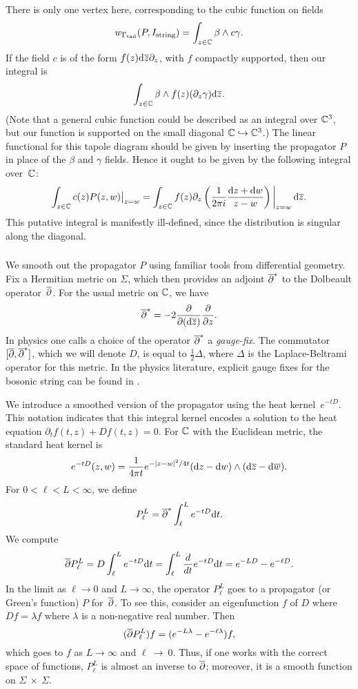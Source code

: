 There is only one vertex here, corresponding to the cubic function on fields
\[
w_{\Gamma_{\rm tad}}(P,I_{\rm string}) = \int_{z \in \mathbb C} \beta \wedge c\gamma.
\]
If the field $c$ is of the form $f(z) {\rm d} \overline{z} \partial_z$,
with $f$ compactly supported, 
then our integral is
\[
\int_{z \in \mathbb C} \beta \wedge f(z)(\partial_z\gamma) {\rm d} \overline{z}.
\]
(Note that a general cubic function could be described as an integral over $\mathbb C^3$,
but our function is supported on the small diagonal $\mathbb C \hookrightarrow \mathbb C^3$.)
The linear functional for this tapole diagram should be given by inserting the propagator $P$ in place of the $\beta$ and $\gamma$ fields. 
Hence it ought to be given by the following integral over~$\mathbb C$:
\[
\int_{z \in \mathbb C} c(z)P(z,w)\big|_{z = w}  
= \int_{z \in \mathbb C} f(z) \partial_z \left(  \frac{1}{2 \pi i} \frac{{\rm d} z + {\rm d} w}{z-w}\right)\bigg|_{z = w}\, {\rm d} \overline{z}.
\]
This putative integral is manifestly ill-defined,
since the distribution is singular along the diagonal.

\subsubsection{}

We smooth out the propagator $P$ using familiar tools from differential geometry.
Fix a Hermitian metric on $\Sigma$, 
which then provides an adjoint $\overline{\partial}^*$ to the Dolbeault operator~$\overline{\partial}$.
For the usual metric on $\mathbb C$, we have
\[
\overline{\partial}^* = -2 \frac{\partial}{\partial ({\rm d} \overline{z})} \frac{\partial}{\partial z}.
\]
In physics one calls a choice of the operator $\overline{\partial}^*$ a {\em gauge-fix}.
The commutator $[\overline{\partial},\overline{\partial}^*]$, which we will denote $D$, 
is equal to $\tfrac{1}{2} \Delta$, where $\Delta$ is the Laplace-Beltrami operator for this metric.
In the physics literature, explicit gauge fixes for the bosonic string can be found in \cite{Bochicchio}.


We introduce a smoothed version of the propagator using the heat kernel~$e^{-tD}$.
This notation indicates that this integral kernel encodes a solution to the heat equation $\partial_t f(t,z) + D f(t,z) = 0$.
For $\mathbb C$ with the Euclidean metric, the standard heat kernel is
\[
e^{-tD}(z,w) =  \frac{1}{4\pi t} e^{-|z-w|^2/4t} ({\rm d} z - {\rm d} w) \wedge ({\rm d}\overline{z} - {\rm d}\overline{w}) . 
\]
For $0 < \ell < L < \infty$, we define
\[
P_\ell^L = \overline{\partial}^* \int_{\ell}^L e^{-tD}{\rm d} t.
\]
We compute
\[
\overline{\partial} P_\ell^L = D \int_{\ell}^L e^{-tD}{\rm d} t =  \int_{\ell}^L \frac{d}{dt} e^{-tD}{\rm d} t = e^{-LD} - e^{-\ell D}.
\]
In the limit as $\ell \to 0$ and $L \to \infty$, the operator $P_\ell^L$ goes to a propagator (or Green's function) $P$ for~$\overline{\partial}$.
To see this, consider an eigenfunction $f$ of $D$ where $Df=\lambda f$ where $\lambda$ is a non-negative real number. 
Then
\[
(\overline{\partial} P_\ell^L) f = (e^{-L\lambda} - e^{-\ell \lambda})f, 
\]
which goes to $f$ as $L \to \infty$ and $\ell~\to~0$.
Thus, if one works with the correct space of functions, 
$P_\ell^L$ is almost an inverse to $\overline{\partial}$;
moreover, it is a smooth function on $\Sigma~\times~\Sigma$. 

